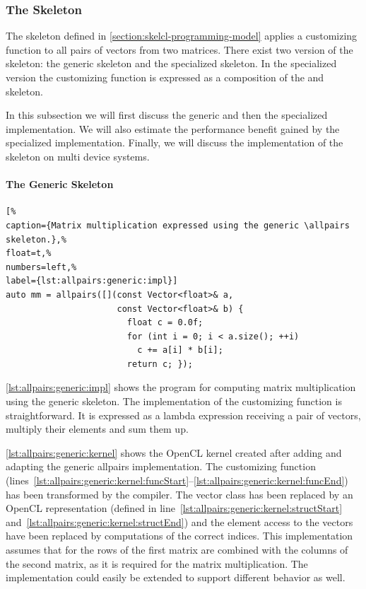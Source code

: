 \subsubsection{The \allpairs Skeleton}
The \allpairs skeleton defined in \autoref{section:skelcl-programming-model} applies a customizing function to all pairs of vectors from two matrices.
There exist two version of the skeleton: the generic \allpairs skeleton and the specialized \allpairs skeleton.
In the specialized version the customizing function is expressed as a composition of the \zip and \reduce skeleton.

In this subsection we will first discuss the generic and then the specialized implementation.
We will also estimate the performance benefit gained by the specialized implementation.
Finally, we will discuss the implementation of the \allpairs skeleton on multi device systems.

\paragraph{The Generic \allpairs Skeleton}
\begin{lstlisting}[%                                                             
caption={Matrix multiplication expressed using the generic \allpairs skeleton.},%
float=t,%                                                                       
numbers=left,%
label={lst:allpairs:generic:impl}]
auto mm = allpairs([](const Vector<float>& a,
                      const Vector<float>& b) {
                        float c = 0.0f;
                        for (int i = 0; i < a.size(); ++i)
                          c += a[i] * b[i];
                        return c; });
\end{lstlisting}

\autoref{lst:allpairs:generic:impl} shows the \SkelCL program for computing matrix multiplication using the generic \allpairs skeleton.
The implementation of the customizing function is straightforward.
It is expressed as a lambda expression receiving a pair of vectors, multiply their elements and sum them up.

\autoref{lst:allpairs:generic:kernel} shows the OpenCL kernel created after adding and adapting the generic allpairs implementation.
The customizing function (lines~\ref{lst:allpairs:generic:kernel:funcStart}--\ref{lst:allpairs:generic:kernel:funcEnd}) has been transformed by the  compiler.
The vector class has been replaced by an OpenCL representation (defined in line~\ref{lst:allpairs:generic:kernel:structStart} and~\ref{lst:allpairs:generic:kernel:structEnd}) and the element access to the vectors have been replaced by computations of the correct indices.
This implementation assumes that for the rows of the first matrix are combined with the columns of the second matrix, as it is required for the matrix multiplication.
The implementation could easily be extended to support different behavior as well.

